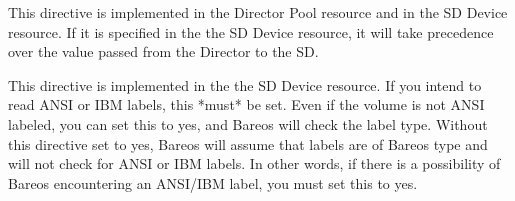 \begin{description}
  This directive is implemented in the Director Pool resource and in the SD Device
  resource.  If it is specified in the the SD Device resource, it will take
  precedence over the value passed from the Director to the SD.

  This directive is implemented in the the SD Device resource.  If you intend
  to read ANSI or IBM labels, this *must* be set.  Even if the volume is
  not ANSI labeled, you can set this to yes, and Bareos will check the
  label type. Without this directive set to yes, Bareos will assume that
  labels are of Bareos type and will not check for ANSI or IBM labels.
  In other words, if there is a possibility of Bareos encountering an
  ANSI/IBM label, you must set this to yes.
\end{description}
